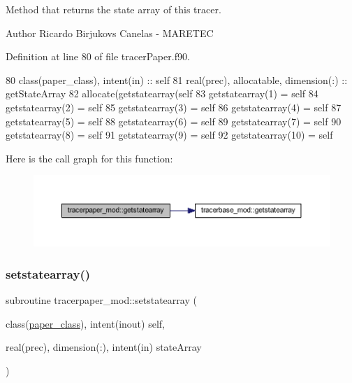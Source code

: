 Method that returns the state array of this tracer. 

\begin{DoxyAuthor}{Author}
Ricardo Birjukovs Canelas -\/ M\+A\+R\+E\+T\+EC 
\end{DoxyAuthor}


Definition at line 80 of file tracer\+Paper.\+f90.


\begin{DoxyCode}
80     \textcolor{keywordtype}{class}(paper\_class), \textcolor{keywordtype}{intent(in)} :: self
81     \textcolor{keywordtype}{real(prec)}, \textcolor{keywordtype}{allocatable}, \textcolor{keywordtype}{dimension(:)} :: getStateArray
82     \textcolor{keyword}{allocate}(getstatearray(self%
83     getstatearray(1) = self%
84     getstatearray(2) = self%
85     getstatearray(3) = self%
86     getstatearray(4) = self%
87     getstatearray(5) = self%
88     getstatearray(6) = self%
89     getstatearray(7) = self%
90     getstatearray(8) = self%
91     getstatearray(9) = self%
92     getstatearray(10) = self%
\end{DoxyCode}
Here is the call graph for this function\+:\nopagebreak
\begin{figure}[H]
\begin{center}
\leavevmode
\includegraphics[width=350pt]{namespacetracerpaper__mod_a703693333469e5091ec8de0a62171294_cgraph}
\end{center}
\end{figure}
\mbox{\label{namespacetracerpaper__mod_abda951b1d3a953fc25f24ee3ce8e2025}} 
\subsubsection{\texorpdfstring{setstatearray()}{setstatearray()}}
{\footnotesize\ttfamily subroutine tracerpaper\+\_\+mod\+::setstatearray (\begin{DoxyParamCaption}\item[{class(\mbox{\hyperlink{structtracerpaper__mod_1_1paper__class}{paper\+\_\+class}}), intent(inout)}]{self,  }\item[{real(prec), dimension(\+:), intent(in)}]{state\+Array }\end{DoxyParamCaption})\hspace{0.3cm}{\ttfamily [private]}}



